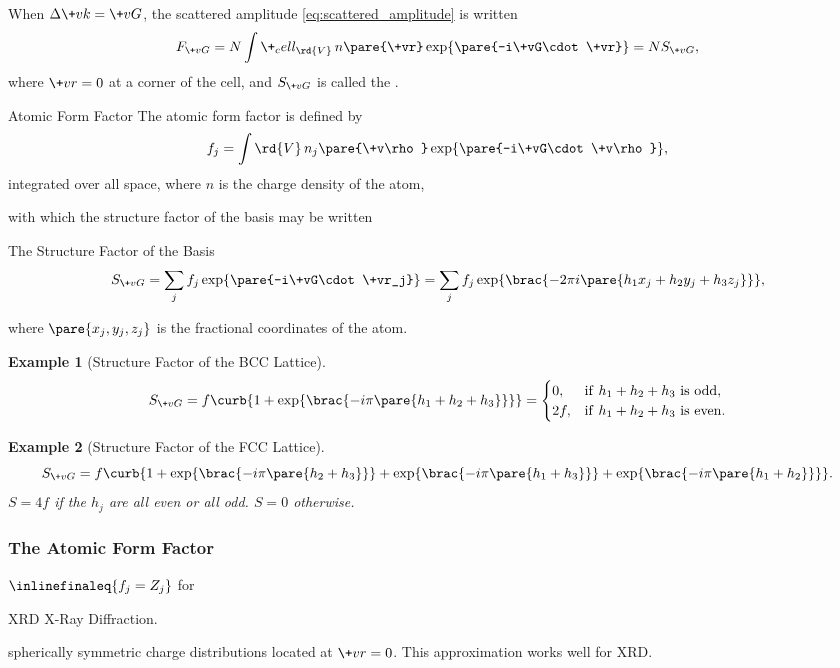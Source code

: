 \documentclass[hidelinks]{article}
\newtheorem{example}{Example}
\begin{document}
When $\Delta \+vk = \+vG$, the scattered amplitude \eqref{eq:scattered_amplitude} is written
\[ F_{\+vG} = N\int\+_cell_ \rd{V}\, n\pare{\+vr} \exp\pare{-i\+vG\cdot \+vr} = NS_{\+vG}, \]
where $\+vr = 0$ at a corner of the cell, and $S_{\+vG}$ is called the .
\begin{termdef}{Atomic Form Factor}
    The atomic form factor is defined by
    \[ f_j = \int \rd{V}\, n_j\pare{\+v\rho} \exp\pare{-i\+vG\cdot \+v\rho}, \]
    integrated over all space, where $n$ is the charge density of the atom,
\end{termdef}
with which the structure factor of the basis may be written
\begin{finaleq}{The Structure Factor of the Basis}
    \[ S_{\+vG} = \sum_j f_j \exp\pare{-i\+vG\cdot \+vr_j} = \sum_j f_j \exp\brac{-2\pi i\pare{h_1 x_j + h_2 y_j + h_3 z_j}}, \]
\end{finaleq}
where $\pare{x_j,y_j,z_j}$ is the fractional coordinates of the atom.
\begin{sample}
    \begin{example}[Structure Factor of the BCC Lattice]
        \[ S_{\+vG} = f\curb{1+\exp\brac{-i\pi\pare{h_1 + h_2 + h_3}}} = \begin{cases}
            0, & \mathrm{if\ } h_1+h_2+h_3\mathrm{\ is\ odd}, \\
            2f, & \mathrm{if\ } h_1+h_2+h_3\mathrm{\ is\ even}. \\
        \end{cases} \]
    \end{example}
\end{sample}
\begin{sample}
    \begin{example}[Structure Factor of the FCC Lattice]
        \[ S_{\+vG} = f\curb{1+\exp\brac{-i\pi\pare{h_2 + h_3}}+\exp\brac{-i\pi\pare{h_1 + h_3}}+\exp\brac{-i\pi\pare{h_1 + h_2}}}. \]
        $S = 4f$ if the $h_j$ are all even or all odd. $S=0$ otherwise.
    \end{example}
\end{sample}


\subsubsection{The Atomic Form Factor} %
\label{ssub:the_atomic_form_factor}

$\inlinefinaleq{f_j = Z_j}$ for \begin{margindef}{XRD}
    X-Ray Diffraction.
\end{margindef} spherically symmetric charge distributions located at $\+vr = 0$. This approximation works well for XRD.



\end{document}
